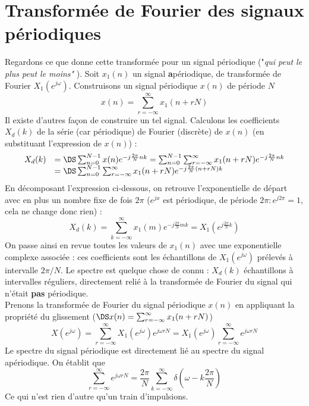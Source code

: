 \section{Transformée de Fourier des signaux périodiques}
Regardons ce que donne cette transformée pour un signal périodique ("\textit{qui peut le plus peut 
le moins" }). Soit $x_1(n)$ un signal \textbf{a}périodique, de transformée de Fourier $X_1(e^{j\omega})$.
Construisons un signal périodique $x(n)$ de période $N$ 
\begin{equation}
x(n) = \sum_{r=-\infty}^{\infty} x_1(n+rN)
\end{equation}
Il existe d'autres façon de construire un tel signal. Calculons les coefficients $X_d(k)$ de la 
série (car périodique) de Fourier (discrète) de $x(n)$ (en substituant l'expression de $x(n)$) :
\begin{equation}
\begin{array}{ll}
X_d(k) &=\DS \sum_{n=0}^{N-1} x(n) e^{-j\frac{2\pi}{N}nk} = \sum_{n=0}^{N-1}\sum_{r=-\infty}^{\infty} x_1(n+rN)
 e^{-j\frac{2\pi}{N}nk}\\
 &=\DS \sum_{n=0}^{N-1}\sum_{r=-\infty}^{\infty} x_1(n+rN) e^{-j\frac{2\pi}{N}(n+rN)k}
 \end{array}
\end{equation}
En décomposant l'expression ci-dessous, on retrouve l'exponentielle de départ avec en plus un
nombre fixe de fois $2\pi$ ($e^{jx}$ est périodique, de période $2\pi : e^{j2\pi}=1$, cela ne 
change donc rien) :
\begin{equation}
X_d(k) = \sum_{k=-\infty}^\infty x_1(m)e^{-j\frac{2\pi}{N}mk} = X_1(e^{j\frac{2\pi}{N}k})
\end{equation}
On passe ainsi en revue toutes les valeurs de $x_1(n)$ avec une exponentielle complexe associée : 
ces coefficients sont les échantillons de $X_1(e^{j\omega})$ prélevés à intervalle $2\pi/N$. Le 
spectre est quelque chose de connu : $X_d(k)$ échantillons à intervalles réguliers, directement 
relié à la transformée de Fourier du signal qui n'était \textbf{pas} périodique.\\

Prenons la transformée de Fourier du signal périodique $x(n)$ en appliquant la propriété du 
glissement ($\DS x(n) = \sum_{r=-\infty}^\infty x_1(n+rN)$)
\begin{equation}
X(e^{j\omega}) = \sum_{r=-\infty}^\infty X_1(e^{j\omega})e^{j\omega rN} = X_1(e^{j\omega})\sum_{
r=-\infty}^\infty e^{j\omega rN}
\end{equation}
Le spectre du signal périodique est directement lié au spectre du signal apériodique. On établit que
\begin{equation}
\sum_{r=-\infty}^\infty e^{j\omega rN} = \dfrac{2\pi}{N}\sum_{k=-\infty}^\infty \delta\left(
\omega-k\dfrac{2\pi}{N}\right)
\end{equation}
Ce qui n'est rien d'autre qu'un train d'impulsions.\\

